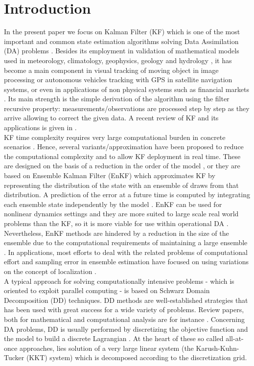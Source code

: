 \documentclass[smallcondensed]{svjour3}
\begin{document}
\section{Introduction}
\label{sec:1}



\noindent In the present paper we focus on Kalman Filter (KF) which is one of the most important and common  state estimation algorithms solving Data Assimilation (DA) problems \cite{Kalman,Kalnay}. Besides its employment in  validation of  mathematical models used in meteorology, climatology, geophysics, geology and hydrology \cite{Wu}, it  has become a main component in visual tracking of moving object in image 
 processing or   autonomous vehicles tracking with GPS in satellite navigation systems, or even in applications of non physical systems such as  financial markets \cite{Karavasilis,Benhamou,Heidari,Wu}.    Its main strength is the simple derivation of the algorithm using the filter recursive property:  measurements/observations are processed step by step as they arrive allowing to correct the given data. A recent review of KF and its applications is given in \cite{Kim}.\\
\noindent KF  time complexity
requires very large computational burden in concrete scenarios  \cite{Lyster,Tang,Tossavainen}.  Hence, several variants/approximation  have been proposed to reduce the computational complexity and to allow KF deployment in real time. These are  designed on the basis
of a reduction in the order of the  model  \cite{Hahnel,Hannachi,Rozier,Wikle},  or they are based on { Ensemble Kalman Filter (EnKF)}  which approximates KF by representing the distribution of the state with an ensemble of draws from that distribution. A prediction of the error at a future time is computed by integrating each ensemble state independently by the model \cite{Evensen}. EnKF can be used for nonlinear dynamics settings and they are  more suited to large scale real world problems than the KF, so it is more viable for use within operational DA \cite{Sandu}. Nevertheless, EnKF methods are hindered by a reduction in the size of the ensemble due to
the computational requirements of maintaining a large ensemble \cite{Anderson,Hamill}.  In applications, most efforts to deal with the related problems of computational effort and sampling error in ensemble estimation have focused on  using variations on the concept of localization \cite{Zhou}.\\
\noindent A typical approach for solving computationally intensive problems - which is  oriented to exploit parallel computing - is based on Schwarz Domain Decomposition (DD) techniques. DD methods are  well-established strategies that has been used with great success for a wide variety of problems. Review papers, both for mathematical and computational analysis are for instance  \cite{Meurant,Quarteroni,Saad,Schwarz}. Concerning DA problems, DD is usually performed by discretizing the objective function and the model to build a discrete Lagrangian \cite{DD-DA}. At the heart of these so called all-at-once approaches,  lies  solution of a very large linear system (the Karush-Kuhn-Tucker (KKT) system) which is  decomposed according to the discretization grid. 
\end{document}
